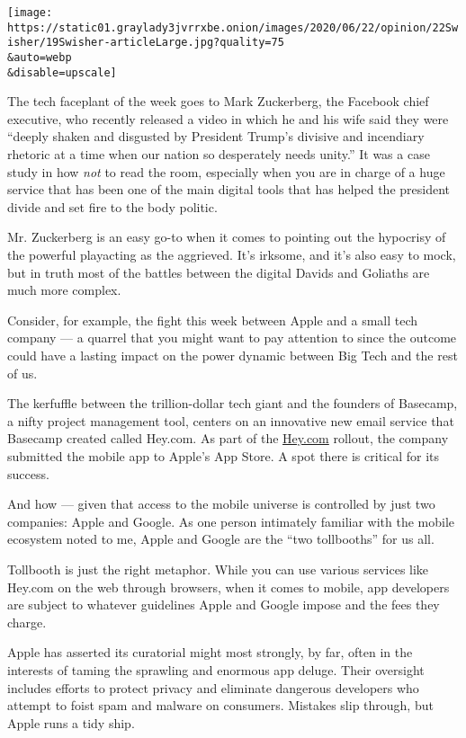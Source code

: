 \texttt{[image: https://static01.graylady3jvrrxbe.onion/images/2020/06/22/opinion/22Swisher/19Swisher-articleLarge.jpg?quality=75\\\&auto=webp\\\&disable=upscale]}

The tech faceplant of the week goes to Mark Zuckerberg, the Facebook
chief executive, who recently released a video in which he and his wife
said they were ``deeply shaken and disgusted by President Trump's
divisive and incendiary rhetoric at a time when our nation so
desperately needs unity.'' It was a case study in how \emph{not} to read
the room, especially when you are in charge of a huge service that has
been one of the main digital tools that has helped the president divide
and set fire to the body politic.

Mr. Zuckerberg is an easy go-to when it comes to pointing out the
hypocrisy of the powerful playacting as the aggrieved. It's irksome, and
it's also easy to mock, but in truth most of the battles between the
digital Davids and Goliaths are much more complex.

Consider, for example, the fight this week between Apple and a small
tech company --- a quarrel that you might want to pay attention to since
the outcome could have a lasting impact on the power dynamic between Big
Tech and the rest of us.

The kerfuffle between the trillion-dollar tech giant and the founders of
Basecamp, a nifty project management tool, centers on an innovative new
email service that Basecamp created called Hey.com. As part of the
\href{https://www.nytimes3xbfgragh.onion/2020/06/17/technology/personaltech/hey-email-service-screening.html}{Hey.com}
rollout, the company submitted the mobile app to Apple's App Store. A
spot there is critical for its success.

And how --- given that access to the mobile universe is controlled by
just two companies: Apple and Google. As one person intimately familiar
with the mobile ecosystem noted to me, Apple and Google are the ``two
tollbooths'' for us all.

Tollbooth is just the right metaphor. While you can use various services
like Hey.com on the web through browsers, when it comes to mobile, app
developers are subject to whatever guidelines Apple and Google impose
and the fees they charge.

Apple has asserted its curatorial might most strongly, by far, often in
the interests of taming the sprawling and enormous app deluge. Their
oversight includes efforts to protect privacy and eliminate dangerous
developers who attempt to foist spam and malware on consumers. Mistakes
slip through, but Apple runs a tidy ship.

